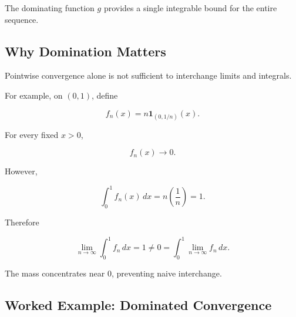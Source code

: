 The dominating function \(g\) provides a single integrable bound for the
entire sequence.

\subsection{Why Domination Matters}
\label{subsec:why-domination-matters}

Pointwise convergence alone is not sufficient to interchange limits and
integrals.

For example, on \((0,1)\), define

\[
f_n(x)
=
n\mathbf{1}_{(0,1/n)}(x).
\]

For every fixed \(x>0\),

\[
f_n(x)\to0.
\]

However,

\[
\int_0^1f_n(x)\,dx
=
n\left(\frac1n\right)
=
1.
\]

Therefore

\[
\boxed{
\lim_{n\to\infty}\int_0^1f_n\,dx
=
1
\neq
0
=
\int_0^1\lim_{n\to\infty}f_n\,dx.
}
\]

The mass concentrates near \(0\), preventing naive interchange.

\subsection{Worked Example: Dominated Convergence}
\label{subsec:worked-dominated-convergence}


